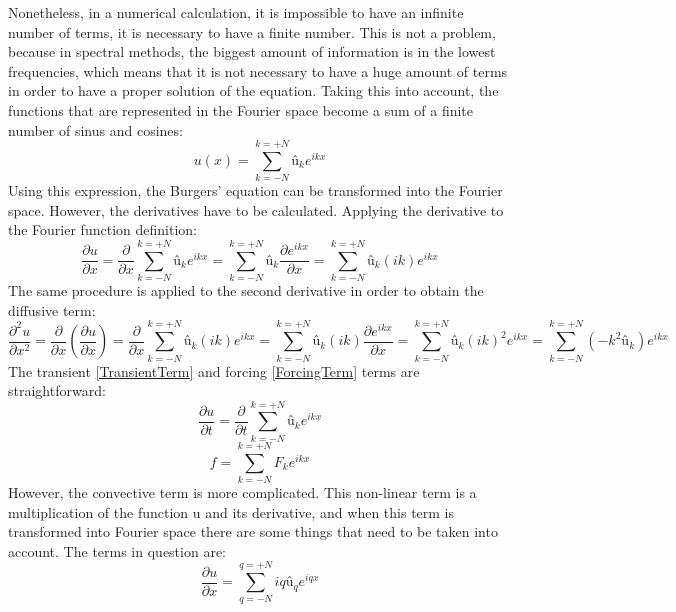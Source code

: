 Nonetheless, in a numerical calculation, it is impossible to have an infinite number of terms, it is necessary to have a finite number. This is not a problem, because in spectral methods, the biggest amount of information is in the lowest frequencies, which means that it is not necessary to have a huge amount of terms in order to have a proper solution of the equation. Taking this into account, the functions that are represented in the Fourier space become a sum of a finite number of sinus and cosines:
\begin{equation}
u\left(x\right)=\sum_{k=-N}^{k=+N}û_{k}e^{ikx}
\end{equation}
Using this expression, the Burgers' equation can be transformed into the Fourier space. However, the derivatives have to be calculated. Applying the derivative to the Fourier function definition:
\begin{equation}
\frac{\partial u}{\partial x}=\frac{\partial}{\partial x}\sum_{k=-N}^{k=+N}û_{k}e^{ikx}=\sum_{k=-N}^{k=+N}û_{k}\frac{\partial e^{ikx}}{\partial x}=\sum_{k=-N}^{k=+N}û_{k}\left(ik\right)e^{ikx}
\end{equation}
The same procedure is applied to the second derivative in order to obtain the diffusive term:
\begin{equation}
\frac{\partial^{2}u}{\partial x^{2}}=\frac{\partial}{\partial x}\left(\frac{\partial u}{\partial x}\right)=\frac{\partial}{\partial x}\sum_{k=-N}^{k=+N}û_{k}\left(ik\right)e^{ikx}=\sum_{k=-N}^{k=+N}û_{k}\left(ik\right)\frac{\partial e^{ikx}}{\partial x}=\sum_{k=-N}^{k=+N}û_{k}\left(ik\right)^{2}e^{ikx}=\sum_{k=-N}^{k=+N}\left(-k^{2}û_{k}\right)e^{ikx}
\end{equation}
The transient \ref{TransientTerm} and forcing \ref{ForcingTerm} terms are straightforward:
\begin{equation}
\frac{\partial u}{\partial t}=\frac{\partial}{\partial t}\sum_{k=-N}^{k=+N}û_{k}e^{ikx}
\label{TransientTerm}
\end{equation}
\begin{equation}
f=\sum_{k=-N}^{k=+N}F_{k}e^{ikx}
\label{ForcingTerm}
\end{equation}
However, the convective term is more complicated. This non-linear term is a multiplication of the function u and its derivative, and when this term is transformed into Fourier space there are some things that need to be taken into account. The terms in question are:
\begin{equation}
\frac{\partial u}{\partial x}=\sum_{q=-N}^{q=+N}iqû_{q}e^{iqx}
\end{equation}
